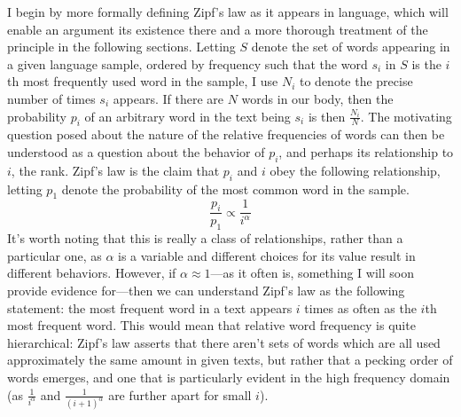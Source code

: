 \documentclass[10pt]{article}
\begin{document}
\begin{flushleft}
    \hspace*{0.5in} I begin by more formally defining Zipf's law as it appears in language, which will enable an argument its existence there and a more thorough treatment of the principle in the following sections. Letting $S$ denote the set of words appearing in a given language sample, ordered by frequency such that the word $s_i$ in $S$ is the $i$th most frequently used word in the sample, I use $N_i$ to denote the precise number of times $s_i$ appears. If there are $N$ words in our body, then the probability $p_i$ of an arbitrary word in the text being $s_i$ is then $\frac{N_i}{N}$. The motivating question posed about the nature of the relative frequencies of words can then be understood as a question about the behavior of $p_i$, and perhaps its relationship to $i$, the rank. Zipf's law is the claim that $p_i$ and $i$ obey the following relationship, letting $p_1$ denote the probability of the most common word in the sample.
    \begin{equation}
        \frac{p_i}{p_1} \propto \frac{1}{i^\alpha} \label{eq:zipf}
    \end{equation}
    It's worth noting that this is really a class of relationships, rather than a particular one, as $\alpha$ is a variable and different choices for its value result in different behaviors. However, if $\alpha \approx 1$---as it often is, something I will soon provide evidence for---then we can understand Zipf's law as the following statement: the most frequent word in a text appears $i$ times as often as the $i$th most frequent word. This would mean that relative word frequency is quite hierarchical: Zipf's law asserts that there aren't sets of words which are all used approximately the same amount in given texts, but rather that a pecking order of words emerges, and one that is particularly evident in the high frequency domain (as $\frac{1}{i^\alpha}$ and $\frac{1}{(i+1)^\alpha}$ are further apart for small $i$).
    

\end{flushleft}
\end{document}
